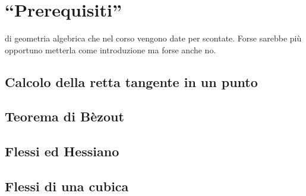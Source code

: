 \chapter{``Prerequisiti''}
\justify

 di geometria algebrica che nel corso vengono date per scontate. Forse sarebbe più opportuno metterla come introduzione ma forse anche no.

\section{Calcolo della retta tangente in un punto}

\section{Teorema di Bèzout}

\section{Flessi ed Hessiano}

\section{Flessi di una cubica}

